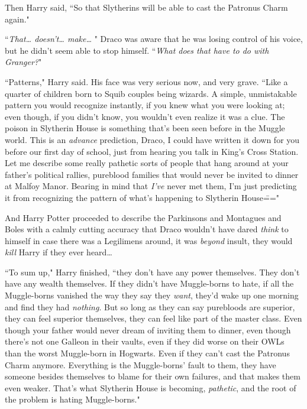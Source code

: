 Then Harry said, ``So that Slytherins will be able to cast the Patronus Charm again."

``\emph{That{\ldots} doesn't{\ldots} make{\ldots} }" Draco was aware that he was losing control of his voice, but he didn't seem able to stop himself. ``\emph{What does that have to do with Granger?}"

``Patterns," Harry said. His face was very serious now, and very grave. ``Like a quarter of children born to Squib couples being wizards. A simple, unmistakable pattern you would recognize instantly, if you knew what you were looking at; even though, if you didn't know, you wouldn't even realize it was a clue. The poison in Slytherin House is something that's been seen before in the Muggle world. This is an \emph{advance} prediction, Draco, I could have written it down for you before our first day of school, just from hearing you talk in King's Cross Station. Let me describe some really pathetic sorts of people that hang around at your father's political rallies, pureblood families that would never be invited to dinner at Malfoy Manor. Bearing in mind that \emph{I've} never met them, I'm just predicting it from recognizing the pattern of what's happening to Slytherin House\==="

And Harry Potter proceeded to describe the Parkinsons and Montagues and Boles with a calmly cutting accuracy that Draco wouldn't have dared \emph{think} to himself in case there was a Legilimens around, it was \emph{beyond} insult, they would \emph{kill} Harry if they ever heard{\ldots}

``To sum up," Harry finished, ``they don't have any power themselves. They don't have any wealth themselves. If they didn't have Muggle-borns to hate, if all the Muggle-borns vanished the way they say they \emph{want}, they'd wake up one morning and find they had \emph{nothing}. But so long as they can say purebloods are superior, they can feel superior themselves, they can feel like part of the master class. Even though your father would never dream of inviting them to dinner, even though there's not one Galleon in their vaults, even if they did worse on their OWLs than the worst Muggle-born in Hogwarts. Even if they can't cast the Patronus Charm anymore. Everything is the Muggle-borns' fault to them, they have someone besides themselves to blame for their own failures, and that makes them even weaker. That's what Slytherin House is becoming, \emph{pathetic}, and the root of the problem is hating Muggle-borns."

